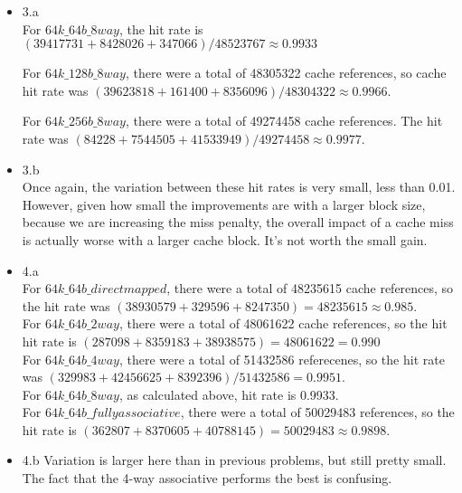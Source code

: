 \documentclass[a4paper]{article}
\begin{document}
\begin{itemize}
\item{3.a} \\
For $64k\_64b\_8way$, the hit rate is $(39417731 + 8428026 + 347066)/48523767 \approx 0.9933$

For $64k\_128b\_8way$, there were a total of 48305322 cache references, 
so cache hit rate was $(39623818 + 161400 + 8356096)/48304322 \approx 0.9966$. 

For $64k\_256b\_8way$, there were a total of 49274458 cache references.
The hit rate was $(84228 + 7544505 + 41533949)/49274458 \approx 0.9977$. \\


\item{3.b} \\ 
Once again, the variation between these hit rates is very small, less than 0.01. However, given how small the improvements are with a larger block size, because we are increasing the miss penalty, the overall impact of a cache miss is actually worse with a larger cache block. It's not worth the small gain.  \\


\item{4.a} \\
For $64k\_64b\_directmapped$, there were a total of 48235615 cache references, so the hit rate was $(38930579 + 329596 + 8247350)=48235615 \approx 0.985$. \\

For $64k\_64b\_2way$, there were a total of 48061622 cache references, so the hit  hit rate is $(287098 + 8359183 + 38938575)=48061622 = 0.990$ \\

For $64k\_64b\_4way$, there were a total of 51432586 referecenes, so the hit rate was $(329983 + 42456625 + 8392396)/51432586 = 0.9951.$ \\

For $64k\_64b\_8way$, as calculated above, hit rate is 0.9933. \\

For $64k\_64b\_fullyassociative$, there were a total of 50029483 references, so the hit rate is $(362807  + 8370605 + 40788145)=50029483 \approx 0.9898$.

\item{4.b}
Variation is larger here than in previous problems, but still pretty small. The fact that the 4-way associative performs the best is confusing. \\


\end{itemize}
\end{document}
